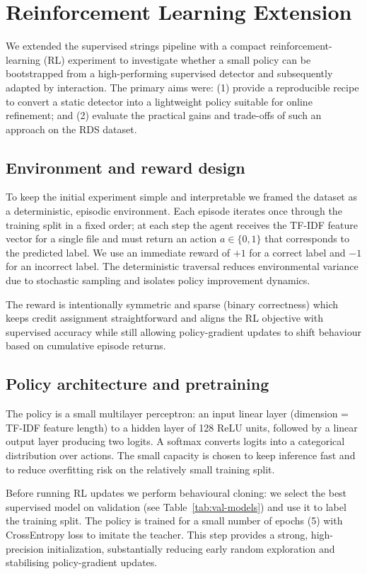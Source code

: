 \documentclass[conference]{IEEEtran}
\begin{document}
\section{Reinforcement Learning Extension}
We extended the supervised strings pipeline with a compact reinforcement-learning (RL) experiment to investigate whether a small policy can be bootstrapped from a high-performing supervised detector and subsequently adapted by interaction. The primary aims were: (1) provide a reproducible recipe to convert a static detector into a lightweight policy suitable for online refinement; and (2) evaluate the practical gains and trade-offs of such an approach on the RDS dataset.

\subsection{Environment and reward design}
To keep the initial experiment simple and interpretable we framed the dataset as a deterministic, episodic environment. Each episode iterates once through the training split in a fixed order; at each step the agent receives the TF-IDF feature vector for a single file and must return an action $a\in\{0,1\}$ that corresponds to the predicted label. We use an immediate reward of $+1$ for a correct label and $-1$ for an incorrect label. The deterministic traversal reduces environmental variance due to stochastic sampling and isolates policy improvement dynamics.

The reward is intentionally symmetric and sparse (binary correctness) which keeps credit assignment straightforward and aligns the RL objective with supervised accuracy while still allowing policy-gradient updates to shift behaviour based on cumulative episode returns.

\subsection{Policy architecture and pretraining}
The policy is a small multilayer perceptron: an input linear layer (dimension = TF-IDF feature length) to a hidden layer of 128 ReLU units, followed by a linear output layer producing two logits. A softmax converts logits into a categorical distribution over actions. The small capacity is chosen to keep inference fast and to reduce overfitting risk on the relatively small training split.

Before running RL updates we perform behavioural cloning: we select the best supervised model on validation (see Table~\ref{tab:val-models}) and use it to label the training split. The policy is trained for a small number of epochs (5) with CrossEntropy loss to imitate the teacher. This step provides a strong, high-precision initialization, substantially reducing early random exploration and stabilising policy-gradient updates.
\end{document}
